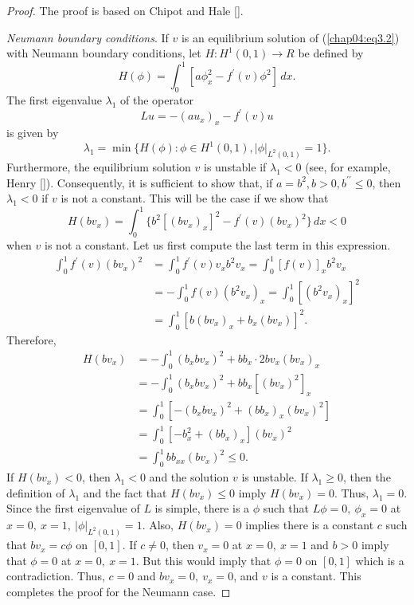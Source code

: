 \documentclass{surv-l}
\theoremstyle{plain}
\theoremstyle{definition}
\numberwithin{equation}{section}
\numberwithin{figure}{chapter}
\begin{document}
\begin{proof} The proof is based on Chipot and Hale [\citeyear{1983ch}].

\emph{Neumann boundary conditions}. If $v$ is an equilibrium solution of (\ref{chap04:eq3.2}) with Neumann boundary conditions, let $H\!:H^{1}(0,1)\rightarrow R$ be defined by
\begin{equation*}
H(\phi)=\int_{0}^{1}[a\phi_{x}^{2}-f^{\prime}(v)\phi^{2}]\,dx.
\end{equation*}
The first eigenvalue $\lambda_{1}$ of the operator
\begin{equation*}
Lu=-(au_{x})_{x}-f^{\prime}(v)u
\end{equation*}
is given by
\begin{equation*}
\lambda_{1}=\min\{H(\phi):\phi\in H^{1}(0,1), |\phi|_{L^{2}(0,1)}=1\}.
\end{equation*}
Furthermore, the equilibrium solution $v$ is unstable if $\lambda_{1}<0$ (see, for example, Henry [\citeyear{1981henry}]). Consequently, it is sufficient to show that, if $a=b^{2}, b>0, b^{\prime\prime}\leq 0$, then $\lambda_{1}<0$ if $v$ is not a constant. This will be the case if we show that
\begin{equation*}
H(bv_{x})=\int_{0}^{1}\{b^{2}[(bv_{x})_{x}]^{2}-f^{\prime}(v)(bv_{x})^{2}\}\,dx<0
\end{equation*}
when $v$ is not a constant. Let us first compute the last term in this expression.
\begin{align*}
\int_{0}^{1}f^{\prime}(v)(bv_{x})^{2}&=\int_{0}^{1}f^{\prime}(v)v_{x}b^{2}v_{x}=\int_{0}^{1}[f(v)]_{x}b^{2}v_{x}\\
&=-\int_{0}^{1}f(v)(b^{2}v_{x})_{x}=\int_{0}^{1}[(b^{2}v_{x})_{x}]^{2}\\
&=\int_{0}^{1}[b(bv_{x})_{x}+b_{x}(bv_{x})]^{2}.
\end{align*}
Therefore,
\begin{align*}
H(bv_{x})&=-\int_{0}^{1}(b_{x}bv_{x})^{2}+bb_{x}\cdot 2bv_{x}(bv_{x})_{x}\\
&=-\int_{0}^{1}(b_{x}bv_{x})^{2}+bb_{x}[(bv_{x})^{2}]_{x}\\
&=\int_{0}^{1}[-(b_{x}bv_{x})^{2}+(bb_{x})_{x}(bv_{x})^{2}]\\
&=\int_{0}^{1}[-b_{x}^{2}+(bb_{x})_{x}](bv_{x})^{2}\\
&=\int_{0}^{1}bb_{xx}(bv_{x})^{2}\leq 0.
\end{align*}
If $H(bv_{x})<0$, then $\lambda_{1}<0$ and the solution $v$ is unstable. If $\lambda_{1}\geq 0$, then the definition of $\lambda_{1}$ and the fact that $H(bv_{x})\leq 0$ imply $H(bv_{x})=0$. Thus, $\lambda_{1}=0$.
Since the first eigenvalue of $L$ is simple, there is a $\phi$ such that $L\phi=0,\ \phi_{x}=0$ at $x=0,\ x=1,\ |\phi|_{L^{2}(0,1)}=1$. Also, $H(bv_{x})=0$ implies there is a constant $c$ such that $ bv_{x}=c\phi$ on $[0,1]$. If $c\neq 0$, then $v_{x}=0$ at $x=0,\ x=1$ and $b>0$ imply that $\phi=0$ at $x=0,\ x=1$. But this would imply that $\phi=0$ on $[0,1]$ which is a contradiction. Thus, $c=0$ and $bv_{x}=0,\ v_{x}=0$, and $v$ is a constant. This completes the proof for the Neumann case.


\end{proof}
\end{document}
